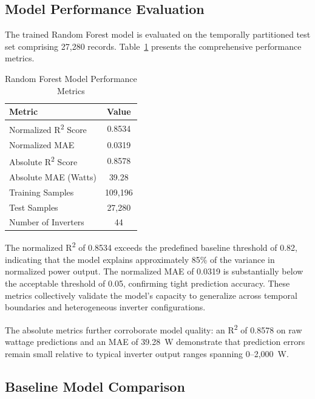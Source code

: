 \documentclass[conference]{IEEEtran}
\renewcommand{\small}{\fontsize{10}{14}\selectfont}
\begin{document}
\subsection{Model Performance Evaluation}

The trained Random Forest model is evaluated on the temporally partitioned test set comprising 27,280 records. Table~\ref{tab:metrics} presents the comprehensive performance metrics.

\begin{table}[H]
\caption{Random Forest Model Performance Metrics}
\begin{center}
\small
\begin{tabular}{|l|c|}
\hline
\textbf{Metric} & \textbf{Value} \\
\hline
Normalized R\textsuperscript{2} Score & 0.8534 \\
\hline
Normalized MAE & 0.0319 \\
\hline
Absolute R\textsuperscript{2} Score & 0.8578 \\
\hline
Absolute MAE (Watts) & 39.28 \\
\hline
Training Samples & 109,196 \\
\hline
Test Samples & 27,280 \\
\hline
Number of Inverters & 44 \\
\hline
\end{tabular}
\label{tab:metrics}
\end{center}
\end{table}

The normalized R\textsuperscript{2} of 0.8534 exceeds the predefined baseline threshold of 0.82, indicating that the model explains approximately 85\% of the variance in normalized power output. The normalized MAE of 0.0319 is substantially below the acceptable threshold of 0.05, confirming tight prediction accuracy. These metrics collectively validate the model's capacity to generalize across temporal boundaries and heterogeneous inverter configurations.

The absolute metrics further corroborate model quality: an R\textsuperscript{2} of 0.8578 on raw wattage predictions and an MAE of 39.28~W demonstrate that prediction errors remain small relative to typical inverter output ranges spanning 0--2,000~W.

\subsection{Baseline Model Comparison}
\end{document}
